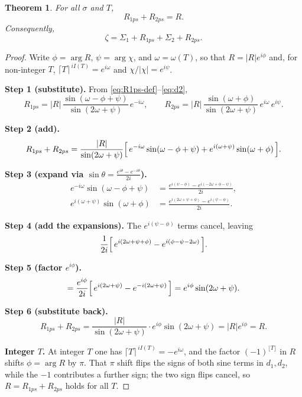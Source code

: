 \documentclass[11pt]{article}
\newtheorem{theorem}{Theorem}[section]
\theoremstyle{definition}
\begin{document}
\begin{theorem}\label{thm:decomp}
For all $\sigma$ and $T$,
\[
R_{1ps} + R_{2ps} = R.
\]
Consequently,
\[
\zeta = \Sigma_{1} + R_{1ps} + \Sigma_{2} + R_{2ps}.
\]
\end{theorem}

\begin{proof}
Write $\phi = \arg R$, $\psi = \arg\chi$, and $\omega=\omega(T)$, so that
$R=|R|e^{i\phi}$ and, for non-integer $T$, $\lceil T\rceil^{\,iI(T)}=e^{i\omega}$
and $\chi/|\chi|=e^{i\psi}$.

\smallskip
\noindent\textbf{Step 1 (substitute).} From \eqref{eq:R1ps-def}--\eqref{eq:d2},
\[
R_{1ps} = |R|\,\frac{\sin(\omega - \phi + \psi)}{\sin(2\omega + \psi)}\, e^{-i\omega},
\qquad
R_{2ps} = |R|\,\frac{\sin(\omega + \phi)}{\sin(2\omega + \psi)}\, e^{i\omega}\, e^{i\psi}.
\]

\noindent\textbf{Step 2 (add).}
\[
R_{1ps} + R_{2ps}
= \frac{|R|}{\sin(2\omega + \psi)}
\Bigl[\, e^{-i\omega}\sin(\omega - \phi + \psi) + e^{i(\omega + \psi)}\sin(\omega + \phi)\,\Bigr].
\]

\noindent\textbf{Step 3 (expand via $\sin\theta = \tfrac{e^{i\theta}-e^{-i\theta}}{2i}$).}
\begin{align*}
e^{-i\omega}\sin(\omega - \phi + \psi)
&= \frac{e^{i(\psi - \phi)} - e^{i(-2\omega + \phi - \psi)}}{2i}, \\
e^{i(\omega + \psi)}\sin(\omega + \phi)
&= \frac{e^{i(2\omega + \psi + \phi)} - e^{i(\psi - \phi)}}{2i}.
\end{align*}

\noindent\textbf{Step 4 (add the expansions).} The $e^{i(\psi-\phi)}$ terms
cancel, leaving
\[
\frac{1}{2i}\Bigl[\, e^{i(2\omega + \psi + \phi)} - e^{i(\phi - \psi - 2\omega)}\,\Bigr].
\]

\noindent\textbf{Step 5 (factor $e^{i\phi}$).}
\[
= \frac{e^{i\phi}}{2i}\Bigl[\, e^{i(2\omega + \psi)} - e^{-i(2\omega + \psi)}\,\Bigr]
= e^{i\phi}\sin(2\omega + \psi).
\]

\noindent\textbf{Step 6 (substitute back).}
\[
R_{1ps} + R_{2ps}
= \frac{|R|}{\sin(2\omega + \psi)}\cdot e^{i\phi}\sin(2\omega + \psi)
= |R|e^{i\phi} = R.
\]

\smallskip
\noindent\textbf{Integer $T$.} At integer $T$ one has
$\lceil T\rceil^{\,iI(T)} = -e^{i\omega}$, and the factor $(-1)^{\lfloor T\rfloor}$
in $R$ shifts $\phi=\arg R$ by $\pi$. That $\pi$ shift flips the signs of both
sine terms in $d_1,d_2$, while the $-1$ contributes a further sign; the two sign
flips cancel, so $R = R_{1ps}+R_{2ps}$ holds for all $T$.
\end{proof}
\end{document}
